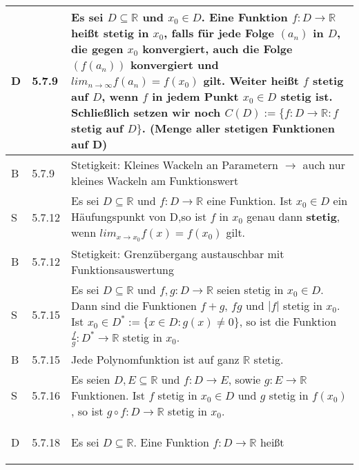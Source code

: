 \begin{longtable}{p{0.75cm} p{1cm} p{16cm}}
        \toprule

        D   & 5.7.9 &   Es sei $D \subseteq \mathbb{R}$ und $x_0 \in D$. Eine Funktion $f : D \rightarrow \mathbb{R}$ heißt
                        \textbf{stetig} in $x_0$, falls für jede Folge $(a_n)$ in $D$, die gegen $x_0$ konvergiert, auch die Folge $(f(a_n))$ 
                        konvergiert und $lim_{n \rightarrow \infty} f(a_n) = f(x_0)$ gilt. \hfill \break 
                        Weiter heißt $f$ stetig auf $D$, wenn $f$ in jedem Punkt $x_0 \in D$ stetig ist. \hfill \break
                        Schließlich setzen wir noch $C(D) := \{f:D \rightarrow \mathbb{R}: f$ stetig auf $D\}$. 
                        (Menge aller stetigen Funktionen auf D) \\
        \midrule
        B   & 5.7.9 &   Stetigkeit: Kleines Wackeln an Parametern $\rightarrow$ auch nur kleines Wackeln am Funktionswert \\
        \midrule
        S   & 5.7.12&   Es sei $D \subseteq \mathbb{R}$ und $f : D \rightarrow \mathbb{R}$ eine Funktion. Ist $x_0 \in D$ ein Häufungspunkt
                        von D,so ist $f$ in $x_0$ genau dann \textbf{stetig}, wenn $lim_{x \rightarrow x_0} f(x) = f(x_0)$ gilt. \\
        \midrule
        B   & 5.7.12&   Stetigkeit: Grenzübergang austauschbar mit Funktionsauswertung \\
        \midrule
        S   & 5.7.15&   Es sei $D \subseteq \mathbb{R}$ und $f,g : D \rightarrow \mathbb{R}$ seien stetig in $x_0 \in D$. Dann sind die
                        Funktionen $f+g$, $fg$ und $|f|$ stetig in $x_0$. \hfill \break
                        Ist $x_0 \in D^* := \{ x \in D: g(x) \neq 0\}$, so ist die Funktion $\frac{f}{g}:D^* \rightarrow \mathbb{R}$ stetig in $x_0$.\\
        \midrule
        B   & 5.7.15&   Jede Polynomfunktion ist auf ganz $\mathbb{R}$ stetig. \\
        \midrule
        S   & 5.7.16&   Es seien $D,E \subseteq \mathbb{R}$ und $f: D \rightarrow E$, sowie $g: E \rightarrow \mathbb{R}$ Funktionen. Ist $f$ 
                        stetig in $x_0 \in D$ und $g$ stetig in $f(x_0)$, so ist $g \circ f: D \rightarrow \mathbb{R}$ stetig in $x_0$. \\ 
        \midrule
        D   & 5.7.18&   Es sei $D \subseteq \mathbb{R}$. Eine Funktion $f: D \rightarrow \mathbb{R}$ heißt
                        \begin{itemize}[topsep=-0.5cm]

\end{itemize}
\end{longtable}
